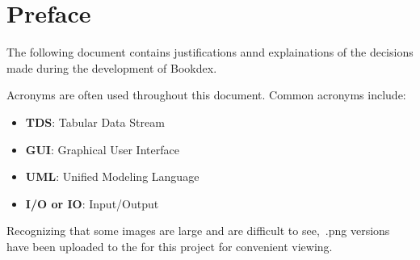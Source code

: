 \documentclass[../design_doc.tex]{subfiles}
\begin{document}
\section{Preface}\label{sec:preface}
The following document contains justifications annd explainations of the decisions made during the development of Bookdex.

Acronyms are often used throughout this document. Common acronyms include:

\begin{itemize}
    \item \textbf{TDS}: Tabular Data Stream
    \item \textbf{GUI}: Graphical User Interface
    \item \textbf{UML}: Unified Modeling Language
    \item \textbf{I/O or IO}: Input/Output
\end{itemize}

Recognizing that some images are large and are difficult to see,~.png versions have been uploaded to the  for this project for convenient viewing.
\end{document}
